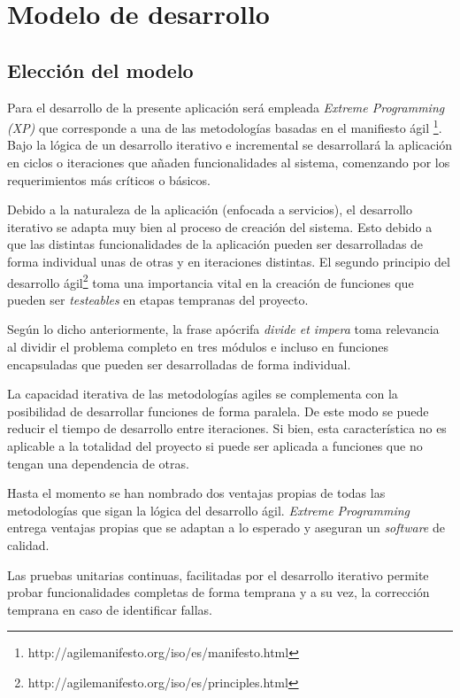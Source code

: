 
\chapter{Modelo de desarrollo}

\section{Elección del modelo}

Para el desarrollo de la presente aplicación será empleada \emph{Extreme Programming (XP)} que corresponde a una de las metodologías basadas en el manifiesto ágil \footnote{http://agilemanifesto.org/iso/es/manifesto.html}. Bajo la lógica de un desarrollo iterativo e incremental se desarrollará la aplicación en ciclos o iteraciones que añaden funcionalidades al sistema, comenzando por los requerimientos más críticos o básicos.

Debido a la naturaleza de la aplicación (enfocada a servicios), el desarrollo iterativo se adapta muy bien al proceso de creación del sistema. Esto debido a que las distintas funcionalidades de la aplicación pueden ser desarrolladas de forma individual unas de otras y en iteraciones distintas. El segundo principio del desarrollo ágil\footnote{http://agilemanifesto.org/iso/es/principles.html} toma una importancia vital en la creación de funciones que pueden ser \emph{testeables} en etapas tempranas del proyecto. 

Según lo dicho anteriormente, la frase apócrifa \emph{divide et impera} toma relevancia al dividir el problema completo en tres módulos e incluso en funciones encapsuladas que pueden ser desarrolladas de forma individual.

La capacidad iterativa de las metodologías agiles se complementa con la posibilidad de desarrollar funciones de forma paralela. De este modo se puede reducir el tiempo de desarrollo entre iteraciones. Si bien, esta característica no es aplicable a la totalidad del proyecto si puede ser aplicada a funciones que no tengan una dependencia de otras. 

Hasta el momento se han nombrado dos ventajas propias de todas las metodologías que sigan la lógica del desarrollo ágil. \emph{Extreme Programming} entrega ventajas propias que se adaptan a lo esperado y aseguran un \emph{software} de calidad. 

Las pruebas unitarias continuas, facilitadas por el desarrollo iterativo permite probar funcionalidades completas de forma temprana y a su vez, la corrección temprana en caso de identificar fallas.

